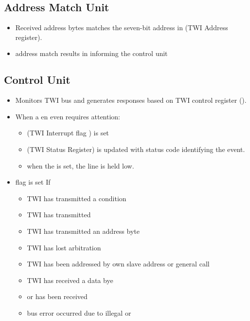 \documentclass{article}
\begin{document}
\subsection{Address Match Unit}
\begin{itemize}
    \item Received address bytes matches the seven-bit address in  (TWI Address register).
    \item address match results in informing the control unit
\end{itemize}

\subsection{Control Unit}
\begin{itemize}
    \item Monitors TWI bus and generates responses based on TWI control register ().
    \item When a en even requires attention:
    \begin{itemize}
        \item {} (TWI Interrupt flag ) is set 
        \item {} (TWI Status Register) is updated with status code identifying the event.
        \item when the  is set, the  line is held low.
    \end{itemize}
    \item {} flag is set If
    \begin{itemize}
        \item TWI has transmitted a  condition
        \item TWI has transmitted 
        \item TWI has transmitted an address byte
        \item TWI has lost arbitration
        \item TWI has been addressed by own slave address or general call
        \item TWI has received a data bye
        \item {} or  has been received
        \item bus error occurred due to illegal  or 
    \end{itemize}
\end{itemize}
\end{document}
